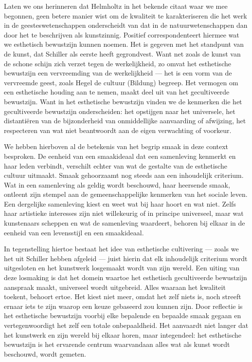 Laten we ons herinneren dat Helmholtz in het bekende citaat waar we mee begonnen, geen betere manier wist om de kwaliteit te karakteriseren die het werk in de geesteswetenschappen onderscheidt van dat in de natuurwetenschappen dan door het te beschrijven als kunstzinnig. Positief correspondenteert hiermee wat we esthetisch bewustzijn kunnen noemen. Het is gegeven met het standpunt van de kunst, dat Schiller als eerste heeft gegrondvest. Want net zoals de kunst van de schone schijn zich verzet tegen de werkelijkheid, zo omvat het esthetische bewustzijn een vervreemding van de werkelijkheid — het is een vorm van de vervreemde geest, zoals Hegel de cultuur (Bildung) begreep. Het vermogen om een esthetische houding aan te nemen, maakt deel uit van het gecultiveerde bewustzijn. Want in het esthetische bewustzijn vinden we de kenmerken die het gecultiveerde bewustzijn onderscheiden: het opstijgen naar het universele, het distantiëren van de bijzonderheid van onmiddellijke aanvaarding of afwijzing, het respecteren van wat niet beantwoordt aan de eigen verwachting of voorkeur.

We hebben hierboven al de betekenis van het begrip smaak in deze context besproken. De eenheid van een smaakideaal dat een samenleving kenmerkt en haar leden verbindt, verschilt echter van wat de gestalte van de esthetische cultuur uitmaakt. Smaak gehoorzaamt nog steeds aan een inhoudelijk criterium. Wat in een samenleving als geldig wordt beschouwd, haar heersende smaak, ontleent zijn stempel aan de gemeenschappelijke kenmerken van het sociale leven. Een dergelijke samenleving kiest en weet wat bij haar hoort en wat niet. Zelfs haar artistieke interesses zijn niet willekeurig of in principe universeel, maar wat kunstenaars scheppen en wat de samenleving waardeert, behoren bij elkaar in de eenheid van een levensstijl en een smaakideaal.

In tegenstelling hiertoe bestaat het idee van esthetische cultivering — zoals we het uit Schiller hebben afgeleid — juist hierin dat elk inhoudelijk criterium wordt uitgesloten en het kunstwerk losgemaakt wordt van zijn wereld. Een uiting van deze losmaking is dat het domein waartoe het esthetisch gecultiveerde bewustzijn aanspraak maakt, universeel wordt uitgebreid. Alles waaraan het kwaliteit toekent, behoort ertoe. Het kiest niet meer, omdat het zelf niets is, noch streeft ernaar iets te zijn waarop een keuze gebaseerd zou kunnen zijn. Door reflectie is het esthetische bewustzijn voorbij elke bepalende en bepaalde smaak gegaan en vertegenwoordigt het zelf een totale onbepaaldheid. Het aanvaardt niet langer dat het kunstwerk en zijn wereld bij elkaar horen, maar integendeel: het esthetische bewustzijn is het ervarende centrum waarvandaan alles wat als kunst wordt beschouwd, wordt gemeten.

